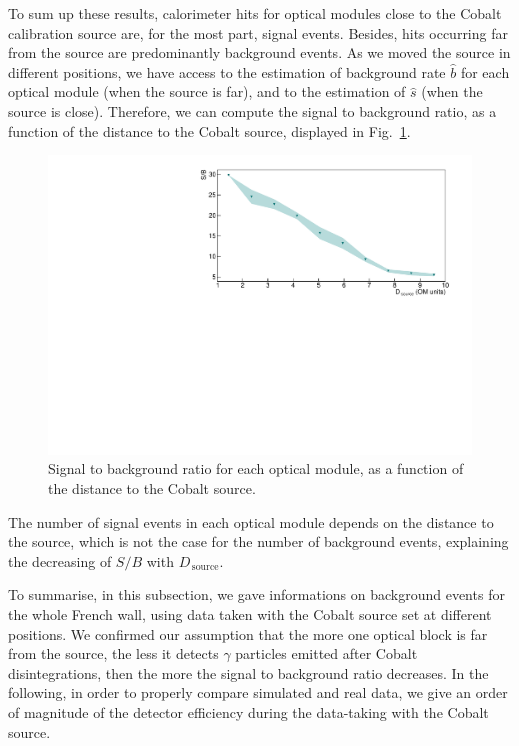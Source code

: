 To sum up these results, calorimeter hits for optical modules close to the Cobalt calibration source are, for the most part, signal events.
Besides, hits occurring far from the source are predominantly background events.
As we moved the source in different positions, we have access to the estimation of background rate $\hat{b}$ for each optical module (when the source is far), and to the estimation of $\hat{s}$ (when the source is close).
Therefore, we can compute the signal to background ratio, as a function of the distance to the Cobalt source, displayed in Fig.~\ref{fig:Co_ratioSB}.
\begin{figure}[h]
  \centering
  \includegraphics[width=1.1\textwidth]{commissioning/fig_commissioning/Co_ratioSB_distance.pdf}
  \caption{Signal to background ratio for each optical module, as a function of the distance to the Cobalt source.
    \label{fig:Co_ratioSB}}
\end{figure}
The number of signal events in each optical module depends on the distance to the source, which is not the case for the number of background events, explaining the decreasing of $S/B$ with $D_{\,\text{source}}$.

To summarise, in this subsection, we gave informations on background events for the whole French wall, using data taken with the Cobalt source set at different positions.
We confirmed our assumption that the more one optical block is far from the source, the less it detects $\gamma$ particles emitted after Cobalt disintegrations, then the more the signal to background ratio decreases.
In the following, in order to properly compare simulated and real data, we give an order of magnitude of the detector efficiency during the data-taking with the Cobalt source.

